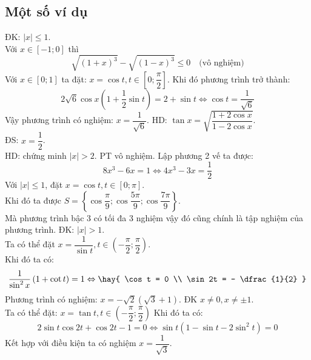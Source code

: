 \subsection{ Một số ví dụ }
\hda
ĐK: $\left| x \right| \le 1$.\\
Với $x \in [ - 1;0]$ thì $$\sqrt {\left( {1 + x} \right)^3 } - \sqrt {\left( {1 - x} \right)^3 } \le 0 \quad \text{(vô nghiệm)}$$ 
Với $x \in [0;1]$ ta đặt: $x = \cos t, t \in \left[ {0;\dfrac{\pi }{2}} \right]$. Khi đó phương trình trở thành: 
$$2\sqrt 6 \cos x\left( {1 + \dfrac{1}{2}\sin t} \right) = 2 + \sin t \Leftrightarrow \cos t = \dfrac{1}{{\sqrt 6 }}$$
Vậy phương trình có nghiệm: $x = \dfrac{1}{{\sqrt 6 }}$.
 \hda
 HD: $\tan x = \sqrt {\dfrac{{1 + 2\cos x}}{{1 - 2\cos x}}} $.\\
 ĐS: $x = \dfrac{1}{2}$.\\
 HD: chứng minh $\left| x \right| > 2$. PT vô nghiệm.
\lgi Lập phương 2 vế ta được: $$8x^3 - 6x = 1 \Leftrightarrow 4x^3 - 3x = \dfrac{1}{2}$$
Với $\left| x \right| \le 1$, đặt $x = \cos t, t \in \left[ {0;\pi } \right]$.\\ Khi đó ta được $S = \left\{ {\cos \dfrac{\pi }{9};\cos \dfrac{{5\pi }}{9};\cos \dfrac{{7\pi }}{9}} \right\}$.\\
Mà phương trình bậc 3 có tối đa 3 nghiệm vậy đó cũng chính là tập nghiệm của phương trình.
\lgi
ĐK: $\left| x \right| > 1$.\\
Ta có thể đặt $x = \dfrac{1}{{\sin t}}, t \in \left( { - \dfrac{\pi }{2};\dfrac{\pi }{2}} \right)$.\\
Khi đó ta có: 
$$\dfrac{1}{{\sin ^2 x}}\left( {1 + \cot t} \right) = 1 \Leftrightarrow \hay{
 \cos t = 0 \\ 
 \sin 2t = - \dfrac{1}{2} }$$
Phương trình có nghiệm:  $x = - \sqrt 2 \left( {\sqrt 3 + 1} \right)$.
\lgi 
ĐK $x \ne 0,x \ne \pm 1$.\\
Ta có thể đặt: $x = \tan t, t \in \left( { - \dfrac{\pi }{2};\dfrac{\pi }{2}} \right)$
Khi đó ta có: $$2\sin t\cos 2t + \cos 2t - 1 = 0 \Leftrightarrow \sin t\left( {1 - \sin t - 2\sin ^2 t} \right) = 0$$
Kết hợp với điều kiện ta có nghiệm $x = \dfrac{1}{{\sqrt 3 }}$.
